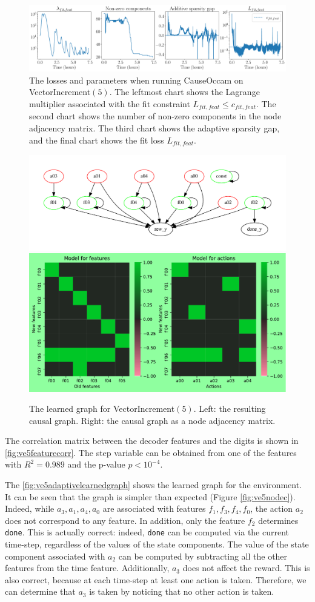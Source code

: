 \documentclass[a4paper,11pt,oneside]{report}
\newcommand{\sysname}{CauseOccam\xspace}
\begin{document}
\begin{figure}
    \centering
    \includegraphics[width=0.95\linewidth]{plots/ve5_adaptive_train_losses}
    \caption{The losses and parameters when running \sysname on VectorIncrement$(5)$. The leftmost chart shows the Lagrange multiplier associated with the fit constraint $L_{fit,feat}\leq c_{fit,feat}$. The second chart shows the number of non-zero components in the node adjacency matrix. The third chart shows the adaptive sparsity gap, and the final chart shows the fit loss $L_{fit,feat}$.}
    \label{fig:ve5adaptivetrainlosses}
\end{figure}


\begin{figure}
    \centering
    \includegraphics[width=0.6\linewidth]{plots/ve5_adaptive_learned_graph}
    \includegraphics[width=0.39\linewidth]{plots/ve5_adaptive_resulting_model_edge}
    \caption{The learned graph for VectorIncrement$(5)$. Left: the resulting causal graph. Right: the causal graph as a node adjacency matrix.}
    \label{fig:ve5adaptivelearnedgraph}
\end{figure}



The correlation matrix between the decoder features and the digits is shown in \autoref{fig:ve5featurecorr}. The step variable can be obtained from one of the features with $R^2=0.989$ and the p-value $p<10^{-4}$.

The \autoref{fig:ve5adaptivelearnedgraph} shows the learned graph for the environment. It can be seen that the graph is simpler than expected (Figure \ref{fig:ve5nodec}). Indeed, while $a_3,a_1,a_4,a_0$ are associated with features $f_1,f_3,f_4,f_0$, the action $a_2$ does not correspond to any feature. In addition, only the feature $f_2$ determines {\tt done}. This is actually correct: indeed, {\tt done} can be computed via the current time-step, regardless of the values of the state components. The value of the state component associated with $a_2$ can be computed by subtracting all the other features from the time feature. Additionally, $a_3$ does not affect the reward. This is also correct, because at each time-step at least one action is taken. Therefore, we can determine that $a_3$ is taken by noticing that no other action is taken.
\end{document}
